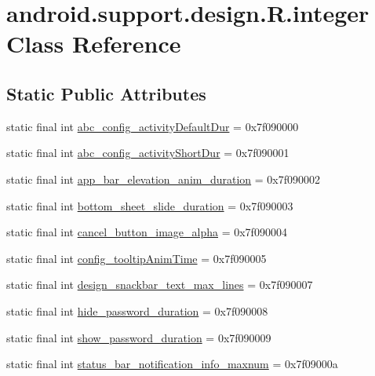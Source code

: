 \hypertarget{classandroid_1_1support_1_1design_1_1_r_1_1integer}{}\section{android.\+support.\+design.\+R.\+integer Class Reference}
\label{classandroid_1_1support_1_1design_1_1_r_1_1integer}
\subsection*{Static Public Attributes}
\begin{DoxyCompactItemize}
\item 
static final int \mbox{\hyperlink{classandroid_1_1support_1_1design_1_1_r_1_1integer_ab0c8a771ad2ae3aba6dc8d9823755f3e}{abc\+\_\+config\+\_\+activity\+Default\+Dur}} = 0x7f090000
\item 
static final int \mbox{\hyperlink{classandroid_1_1support_1_1design_1_1_r_1_1integer_a5cc6424d72a443bb45486cf8746b7bc1}{abc\+\_\+config\+\_\+activity\+Short\+Dur}} = 0x7f090001
\item 
static final int \mbox{\hyperlink{classandroid_1_1support_1_1design_1_1_r_1_1integer_a0ccf14317bb3c589aa527685fa603dba}{app\+\_\+bar\+\_\+elevation\+\_\+anim\+\_\+duration}} = 0x7f090002
\item 
static final int \mbox{\hyperlink{classandroid_1_1support_1_1design_1_1_r_1_1integer_a9232e8a7524ef36aadf986b2ac0d61a4}{bottom\+\_\+sheet\+\_\+slide\+\_\+duration}} = 0x7f090003
\item 
static final int \mbox{\hyperlink{classandroid_1_1support_1_1design_1_1_r_1_1integer_a3b9b1c57b76ebfa9f445b3f40ee6f2ad}{cancel\+\_\+button\+\_\+image\+\_\+alpha}} = 0x7f090004
\item 
static final int \mbox{\hyperlink{classandroid_1_1support_1_1design_1_1_r_1_1integer_ade6fb0e33173bce29fca86fc670d1169}{config\+\_\+tooltip\+Anim\+Time}} = 0x7f090005
\item 
static final int \mbox{\hyperlink{classandroid_1_1support_1_1design_1_1_r_1_1integer_a938a7c8efcde243e2e8cf2089e78f7f0}{design\+\_\+snackbar\+\_\+text\+\_\+max\+\_\+lines}} = 0x7f090007
\item 
static final int \mbox{\hyperlink{classandroid_1_1support_1_1design_1_1_r_1_1integer_ac0c8d73bfaf81079f1472fd3154aae8b}{hide\+\_\+password\+\_\+duration}} = 0x7f090008
\item 
static final int \mbox{\hyperlink{classandroid_1_1support_1_1design_1_1_r_1_1integer_a10ce8bfe10cb0e779af49220383e052c}{show\+\_\+password\+\_\+duration}} = 0x7f090009
\item 
static final int \mbox{\hyperlink{classandroid_1_1support_1_1design_1_1_r_1_1integer_a4b128748dfc77dbedbe2c85115af5a64}{status\+\_\+bar\+\_\+notification\+\_\+info\+\_\+maxnum}} = 0x7f09000a
\end{DoxyCompactItemize}

